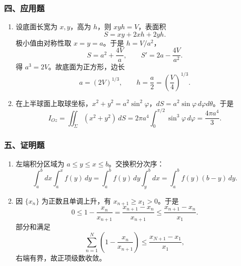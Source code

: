 \subsubsection*{四、应用题}
\begin{enumerate}
  \item 设底面长宽为 $x,y$，高为 $h$，则 $xyh=V$，表面积
  \[
  S=xy+2xh+2yh.
  \]
  极小值由对称性取 $x=y=a$。于是 $h=V/a^2$，
  \[
  S=a^2+\frac{4V}{a},\qquad S'=2a-\frac{4V}{a^2}.
  \]
  得 $a^3=2V$。故底面为正方形，边长
  \[
  a=(2V)^{1/3},\qquad h=\frac a2=\left(\frac V4\right)^{1/3}.
  \]
  \item 在上半球面上取球坐标，$x^2+y^2=a^2\sin^2\varphi$，$dS=a^2\sin\varphi\,d\varphi d\theta$。于是
  \[
  I_{Oz}=\iint_\Sigma(x^2+y^2)\,dS
  =2\pi a^4\int_0^{\pi/2}\sin^3\varphi\,d\varphi
  =\frac{4\pi a^4}{3}.
  \]
\end{enumerate}

\subsubsection*{五、证明题}
\begin{enumerate}
  \item 左端积分区域为 $a\le y\le x\le b$。交换积分次序：
  \[
  \int_a^b dx\int_a^x f(y)\,dy
  =\int_a^b f(y)\,dy\int_y^b dx
  =\int_a^b f(y)(b-y)\,dy.
  \]
  \item 因 $\{x_n\}$ 为正数且单调上升，有 $x_{n+1}\ge x_1>0$。于是
  \[
  0\le1-\frac{x_n}{x_{n+1}}
  =\frac{x_{n+1}-x_n}{x_{n+1}}
  \le\frac{x_{n+1}-x_n}{x_1}.
  \]
  部分和满足
  \[
  \sum_{n=1}^N\left(1-\frac{x_n}{x_{n+1}}\right)
  \le\frac{x_{N+1}-x_1}{x_1},
  \]
  右端有界，故正项级数收敛。
\end{enumerate}
